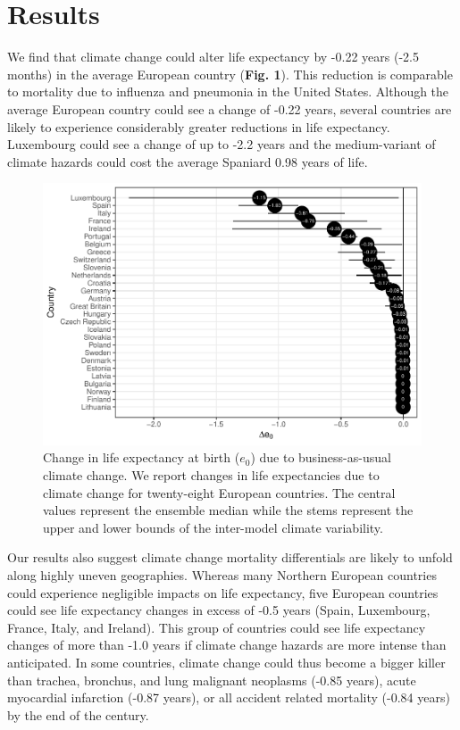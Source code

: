 \documentclass[12pt,]{article}
\makeatletter
\def\maxwidth{\ifdim\Gin@nat@width>\linewidth\linewidth
\else\Gin@nat@width\fi}
\let\Oldincludegraphics\includegraphics
\renewcommand{\includegraphics}[1]{\Oldincludegraphics[width=\maxwidth]{#1}}
\makeatother
\begin{document}
\section{Results}\label{results}

We find that climate change could alter life expectancy by -0.22 years
(-2.5 months) in the average European country (\textbf{Fig. 1}). This
reduction is comparable to mortality due to influenza and pneumonia
\citep{arias2013united} in the United States. Although the average
European country could see a change of -0.22 years, several countries
are likely to experience considerably greater reductions in life
expectancy. Luxembourg could see a change of up to -2.2 years and the
medium-variant of climate hazards could cost the average Spaniard 0.98
years of life.

\begin{figure}
\centering
\includegraphics{MS-cclifeexpec_files/figure-latex/unnamed-chunk-1-1.pdf}
\caption{Change in life expectancy at birth (\(e_0\)) due to
business-as-usual climate change. We report changes in life expectancies
due to climate change for twenty-eight European countries. The central
values represent the ensemble median while the stems represent the upper
and lower bounds of the inter-model climate variability.}
\end{figure}

Our results also suggest climate change mortality differentials are
likely to unfold along highly uneven geographies. Whereas many Northern
European countries could experience negligible impacts on life
expectancy, five European countries could see life expectancy changes in
excess of -0.5 years (Spain, Luxembourg, France, Italy, and Ireland).
This group of countries could see life expectancy changes of more than
-1.0 years if climate change hazards are more intense than anticipated.
In some countries, climate change could thus become a bigger killer than
trachea, bronchus, and lung malignant neoplasms (-0.85 years), acute
myocardial infarction (-0.87 years), or all accident related mortality
(-0.84 years) \citep{arias2013united} by the end of the century.
\end{document}
